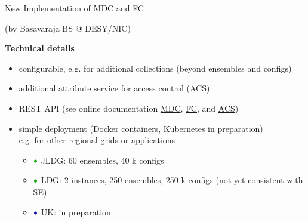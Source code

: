 \documentclass[aspectratio=169,xcolor=dvipsnames]{beamer}
\newcommand{\blue}{\color{b1}}
\newcommand{\green}{\color{g3}}
\newcommand{\bi}{\begin{itemize}}
\newcommand{\ei}{\end{itemize}}
\begin{document}
\begin{frame}{New Implementation of MDC and FC}
  \vspace*{-10mm}
  \begin{center}
    (by Basavaraja BS $@$ DESY/NIC)
  \end{center}
  
  {\bf Technical details} 
  \bi %
  \item configurable, e.g. for additional collections (beyond ensembles and configs)
  \item additional attribute service for access control (ACS)
  \item REST API (see online documentation
    \href{https://idefix-vm10.zeuthen.desy.de/ildg/mdc/swagger-ui/index.html}{MDC},
    \href{https://idefix-vm10.zeuthen.desy.de/ildg/fc/swagger-ui/index.html}{FC}, and
    \href{https://idefix-vm10.zeuthen.desy.de/ildg/acs/swagger-ui/index.html}{ACS})
  \item simple deployment (Docker containers, Kubernetes in preparation)\\
    e.g. for other regional grids or applications
    \bi
    \item[$\green\bullet$] JLDG: 60 ensembles, 40 k configs \\
    \item[$\green\bullet$] LDG: 2 instances, 250 ensembles, 250 k configs (not yet consistent with SE)
    \item[$\blue\bullet$] UK: in preparation
    \ei
  \ei
  \vfill
\end{frame}
\end{document}
